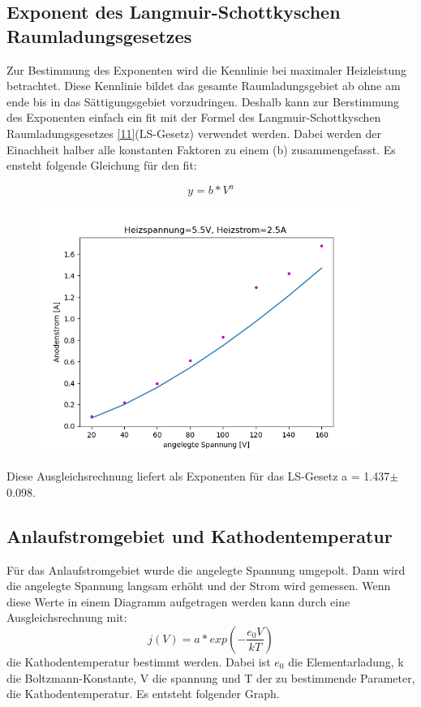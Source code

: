 \subsection{Exponent des Langmuir-Schottkyschen Raumladungsgesetzes}

Zur Bestimmung des Exponenten wird die Kennlinie bei maximaler Heizleistung betrachtet. Diese Kennlinie bildet das gesamte Raumladungsgebiet ab ohne am ende bis in das Sättigungsgebiet vorzudringen. Deshalb kann zur Berstimmung des Exponenten einfach ein fit mit der Formel des Langmuir-Schottkyschen Raumladungsgesetzes \ref{11}(LS-Gesetz) verwendet werden. Dabei werden der Einachheit halber alle konstanten Faktoren zu einem (b) zusammengefasst. Es ensteht folgende Gleichung für den fit:

\begin{displaymath}
    y = b * V^a
\end{displaymath}

\begin{figure}[H]
    \centering
    \includegraphics[height=8cm]{"LS.png"}
\end{figure}

\noindent Diese Ausgleichsrechnung liefert als Exponenten für das LS-Gesetz a = 1.437$\pm$0.098.

\subsection{Anlaufstromgebiet und Kathodentemperatur}

Für das Anlaufstromgebiet wurde die angelegte Spannung umgepolt. Dann wird die angelegte Spannung langsam erhöht und der Strom wird gemessen. Wenn diese Werte in einem Diagramm aufgetragen werden kann durch eine Ausgleichsrechnung mit:
\begin{displaymath}
    j(V)= a*exp \left(-\frac{e_0 V}{kT} \right)
\end{displaymath}
\noindent die Kathodentemperatur bestimmt werden. Dabei ist $e_0$ die Elementarladung, k die Boltzmann-Konstante, V die spannung und T der zu bestimmende Parameter, die Kathodentemperatur. Es entsteht folgender Graph.

